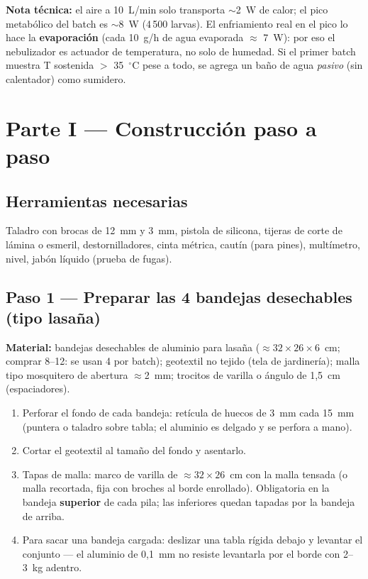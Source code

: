 \documentclass[11pt,a4paper]{article}
\newcommand{\paso}[1]{\subsection*{\large Paso #1}}
\begin{document}
\noindent\textbf{Nota técnica:} el aire a 10~L/min solo transporta ${\sim}$2~W
de calor; el pico metabólico del batch es ${\sim}$8~W (4\,500 larvas). El
enfriamiento real en el pico lo hace la \textbf{evaporación} (cada 10~g/h de
agua evaporada ${\approx}$ 7~W): por eso el nebulizador es actuador de
temperatura, no solo de humedad. Si el primer batch muestra T sostenida
$>$ 35~$^\circ$C pese a todo, se agrega un baño de agua \emph{pasivo} (sin
calentador) como sumidero.

\newpage
\section{Parte I --- Construcción paso a paso}

\subsection*{Herramientas necesarias}
Taladro con brocas de 12~mm y 3~mm, pistola de silicona, tijeras de corte de
lámina o esmeril, destornilladores, cinta métrica, cautín (para pines),
multímetro, nivel, jabón líquido (prueba de fugas).

\paso{1 --- Preparar las 4 bandejas desechables (tipo lasaña)}
\textbf{Material:} bandejas desechables de aluminio para lasaña
(${\approx}32\times26\times6$~cm; comprar 8--12: se usan 4 por batch);
geotextil no tejido (tela de jardinería); malla tipo mosquitero de abertura
${\approx}$2~mm; trocitos de varilla o ángulo de 1,5~cm (espaciadores).

\begin{enumerate}
  \item Perforar el fondo de cada bandeja: retícula de huecos de 3~mm cada
        15~mm (puntera o taladro sobre tabla; el aluminio es delgado y se
        perfora a mano).
  \item Cortar el geotextil al tamaño del fondo y asentarlo.
  \item Tapas de malla: marco de varilla de ${\approx}32\times26$~cm con la
        malla tensada (o malla recortada, fija con broches al borde
        enrollado). Obligatoria en la bandeja \textbf{superior} de cada pila;
        las inferiores quedan tapadas por la bandeja de arriba.
  \item Para sacar una bandeja cargada: deslizar una tabla rígida debajo y
        levantar el conjunto --- el aluminio de 0,1~mm no resiste levantarla
        por el borde con 2--3~kg adentro.
\end{enumerate}
\end{document}
